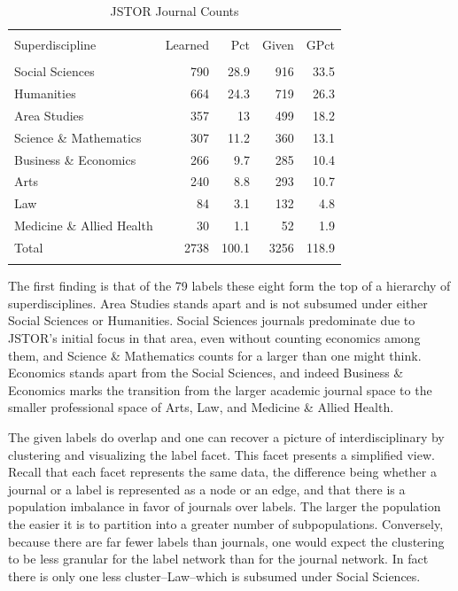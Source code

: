 \documentclass[]{book}
\theoremstyle{definition}
\theoremstyle{definition}
\theoremstyle{definition}
\theoremstyle{remark}
\begin{document}
\begin{table}[!htbp] \centering 
  \caption{JSTOR Journal Counts} 
  \label{tab:jclu-tab-sup} 
\begin{tabular}{@{\extracolsep{5pt}} lrrrr} 
\\[-1.8ex]\hline 
\hline \\[-1.8ex] 
Superdiscipline & Learned & Pct & Given & GPct \\ 
\hline \\[-1.8ex] 
Social Sciences & 790 & 28.9 & 916 & 33.5 \\ 
Humanities & 664 & 24.3 & 719 & 26.3 \\ 
Area Studies & 357 & 13 & 499 & 18.2 \\ 
Science \& Mathematics & 307 & 11.2 & 360 & 13.1 \\ 
Business \& Economics & 266 & 9.7 & 285 & 10.4 \\ 
Arts & 240 & 8.8 & 293 & 10.7 \\ 
Law & 84 & 3.1 & 132 & 4.8 \\ 
Medicine \& Allied Health & 30 & 1.1 & 52 & 1.9 \\ 
Total & 2738 & 100.1 & 3256 & 118.9 \\ 
\hline \\[-1.8ex] 
\end{tabular} 
\end{table}

The first finding is that of the 79 labels these eight form the top of a
hierarchy of superdisciplines. Area Studies stands apart and is not
subsumed under either Social Sciences or Humanities. Social Sciences
journals predominate due to JSTOR's initial focus in that area, even
without counting economics among them, and Science \& Mathematics counts
for a larger than one might think. Economics stands apart from the
Social Sciences, and indeed Business \& Economics marks the transition
from the larger academic journal space to the smaller professional space
of Arts, Law, and Medicine \& Allied Health.

The given labels do overlap and one can recover a picture of
interdisciplinary by clustering and visualizing the label facet. This
facet presents a simplified view. Recall that each facet represents the
same data, the difference being whether a journal or a label is
represented as a node or an edge, and that there is a population
imbalance in favor of journals over labels. The larger the population
the easier it is to partition into a greater number of subpopulations.
Conversely, because there are far fewer labels than journals, one would
expect the clustering to be less granular for the label network than for
the journal network. In fact there is only one less cluster--Law--which
is subsumed under Social Sciences.
\end{document}

